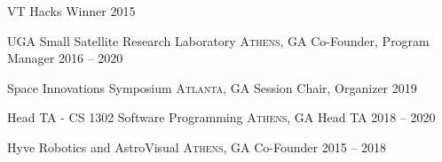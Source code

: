 \documentclass[10pt,a4paper]{article}
\begin{document}
\headedsection
  {{VT Hacks}}
  {%
  \headedsubsection
    {Winner}
    {2015}
    {
    }
}


\spacedhrule{0.5em}{-0.4em}


\vspace{-0.2em}

\headedsection
  {{UGA Small Satellite Research Laboratory}}
  {\textsc{Athens, GA}} {%
  \headedsubsection
    {Co-Founder, Program Manager}
    {2016 -- 2020}
    {
    }
}

\headedsection
  {{Space Innovations Symposium}}
  {\textsc{Atlanta, GA}} {%
  \headedsubsection
    {Session Chair, Organizer}
    {2019}
    {
    }
}

\headedsection
  {{Head TA - CS 1302 Software Programming}}
  {\textsc{Athens, GA}} {%
  \headedsubsection
    {Head TA}
    {2018 -- 2020}
    {
    }
}

\headedsection
  {{Hyve Robotics and AstroVisual}}
  {\textsc{Athens, GA}} {%
  \headedsubsection
    {Co-Founder}
    {2015 -- 2018}
    {
    }
}
\end{document}
